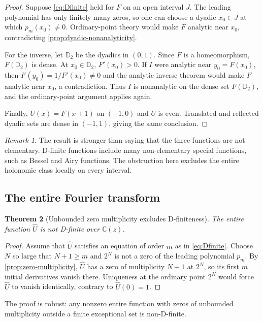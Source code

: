 \documentclass[11pt,oneside]{article}
\newtheorem{theorem}{Theorem}[section]
\theoremstyle{definition}
\theoremstyle{remark}
\newtheorem{remark}[theorem]{Remark}
\newcommand{\C}{\mathbb C}
\newcommand{\Dyad}{\mathbb D_2}
\begin{document}
\begin{proof}
Suppose \eqref{eq:Dfinite} held for $F$ on an open interval $J$.  The leading polynomial has only finitely many zeros, so one can choose a dyadic $x_0\in J$ at which $p_m(x_0)\ne0$.  Ordinary-point theory would make $F$ analytic near $x_0$, contradicting \cref{prop:dyadic-nonanalyticity}.

For the inverse, let $\Dyad$ be the dyadics in $(0,1)$.  Since $F$ is a homeomorphism, $F(\Dyad)$ is dense.  At $x_0\in\Dyad$, $F'(x_0)>0$.  If $I$ were analytic near $y_0=F(x_0)$, then $I'(y_0)=1/F'(x_0)\ne0$ and the analytic inverse theorem would make $F$ analytic near $x_0$, a contradiction.  Thus $I$ is nonanalytic on the dense set $F(\Dyad)$, and the ordinary-point argument applies again.

Finally, $U(x)=F(x+1)$ on $(-1,0)$ and $U$ is even.  Translated and reflected dyadic sets are dense in $(-1,1)$, giving the same conclusion.
\end{proof}

\begin{remark}
The result is stronger than saying that the three functions are not elementary.  D-finite functions include many non-elementary special functions, such as Bessel and Airy functions.  The obstruction here excludes the entire holonomic class locally on every interval.
\end{remark}

\subsection{The entire Fourier transform}
\begin{theorem}[Unbounded zero multiplicity excludes D-finiteness]
\label{thm:fourier-nondfinite}
The entire function $\widehat U$ is not D-finite over $\C(z)$.
\end{theorem}

\begin{proof}
Assume that $\widehat U$ satisfies an equation of order $m$ as in \eqref{eq:Dfinite}.  Choose $N$ so large that $N+1\ge m$ and $2^N$ is not a zero of the leading polynomial $p_m$.  By \cref{prop:zero-multiplicity}, $\widehat U$ has a zero of multiplicity $N+1$ at $2^N$, so its first $m$ initial derivatives vanish there.  Uniqueness at the ordinary point $2^N$ would force $\widehat U$ to vanish identically, contrary to $\widehat U(0)=1$.
\end{proof}

The proof is robust: any nonzero entire function with zeros of unbounded multiplicity outside a finite exceptional set is non-D-finite.
\end{document}
